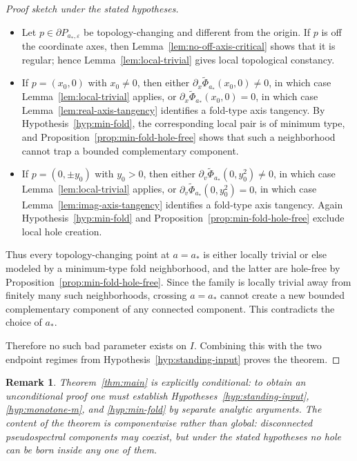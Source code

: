 \documentclass[11pt]{article}
\newtheorem{remark}[theorem]{Remark}
\begin{document}
\begin{proof}[Proof sketch under the stated hypotheses]
\begin{itemize}
\item Let \(p\in\partial P_{a_*,\varepsilon}\) be topology-changing and different from the origin. If \(p\) is off the coordinate axes, then Lemma~\ref{lem:no-off-axis-critical} shows that it is regular; hence Lemma~\ref{lem:local-trivial} gives local topological constancy.

\item If \(p=(x_0,0)\) with \(x_0\neq 0\), then either \(\partial_x\widetilde\Phi_{a_*}(x_0,0)\neq 0\), in which case Lemma~\ref{lem:local-trivial} applies, or \(\partial_x\widetilde\Phi_{a_*}(x_0,0)=0\), in which case Lemma~\ref{lem:real-axis-tangency} identifies a fold-type axis tangency. By Hypothesis~\ref{hyp:min-fold}, the corresponding local pair is of minimum type, and Proposition~\ref{prop:min-fold-hole-free} shows that such a neighborhood cannot trap a bounded complementary component.

\item If \(p=(0,\pm y_0)\) with \(y_0>0\), then either \(\partial_v\widetilde\Phi_{a_*}(0,y_0^2)\neq 0\), in which case Lemma~\ref{lem:local-trivial} applies, or \(\partial_v\widetilde\Phi_{a_*}(0,y_0^2)=0\), in which case Lemma~\ref{lem:imag-axis-tangency} identifies a fold-type axis tangency. Again Hypothesis~\ref{hyp:min-fold} and Proposition~\ref{prop:min-fold-hole-free} exclude local hole creation.
\end{itemize}

Thus every topology-changing point at \(a=a_*\) is either locally trivial or else modeled by a minimum-type fold neighborhood, and the latter are hole-free by Proposition~\ref{prop:min-fold-hole-free}. Since the family is locally trivial away from finitely many such neighborhoods, crossing \(a=a_*\) cannot create a new bounded complementary component of any connected component. This contradicts the choice of \(a_*\).

Therefore no such bad parameter exists on \(I\). Combining this with the two endpoint regimes from Hypothesis~\ref{hyp:standing-input} proves the theorem.
\end{proof}

\begin{remark}
Theorem~\ref{thm:main} is explicitly conditional: to obtain an unconditional proof one must establish Hypotheses~\ref{hyp:standing-input}, \ref{hyp:monotone-m}, and \ref{hyp:min-fold} by separate analytic arguments. The content of the theorem is componentwise rather than global: disconnected pseudospectral components may coexist, but under the stated hypotheses no hole can be born inside any one of them.
\end{remark}
\end{document}
